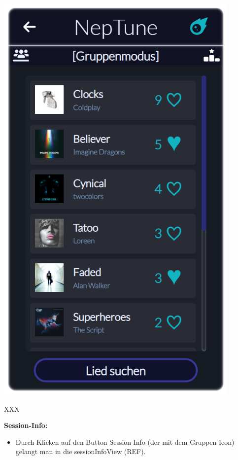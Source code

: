 \documentclass[oneside, ngerman]{sdqtechreport}
\begin{document}
\begin{minipage}{0.5\textwidth}
    \hypertarget{sessionVoteView}{}
    \includegraphics[width=0.9\textwidth]{LATEX/Pflichtenheft/GraphicDesigns/userVotePage.png}
\end{minipage} 
\hfill
\begin{minipage}{0.5\textwidth}
    XXX
\end{minipage}

\textbf{Session-Info:}
\begin{itemize}
    \item Durch Klicken auf den Button Session-Info (der mit dem Gruppen-Icon) gelangt man in die sessionInfoView (REF).
\end{itemize}
\end{document}
